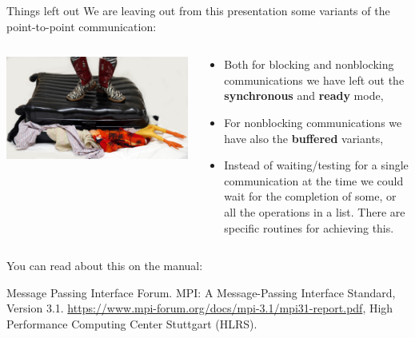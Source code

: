 \documentclass[xcolor={svgnames,usenames}]{beamer}
\begin{document}
\begin{frame}{Things left out}
We are leaving out from this presentation some variants of the point-to-point communication:
\begin{columns}
\begin{column}{0.4\columnwidth}
\centering
\includegraphics[width=\columnwidth]{fullsuitcase.jpg}
\end{column}
\begin{column}{0.6\columnwidth}
\begin{itemize}
\item Both for blocking and nonblocking communications we have left out the \textbf{synchronous} and \textbf{ready} mode,
\item For nonblocking communications we have also the \textbf{buffered} variants,
\item Instead of waiting/testing for a single communication at the time we could wait for the completion of some, or all the operations
in a list. There are specific routines for achieving this.
\end{itemize}
\end{column}

\end{columns}
\vfill
You can read about this on the manual:
\begin{thebibliography}{10}
  \footnotesize Message Passing Interface Forum. MPI: A Message-Passing Interface Standard, Version 3.1. \url{https://www.mpi-forum.org/docs/mpi-3.1/mpi31-report.pdf}, High Performance Computing Center Stuttgart (HLRS).
\end{thebibliography}


\end{frame}
\end{document}
